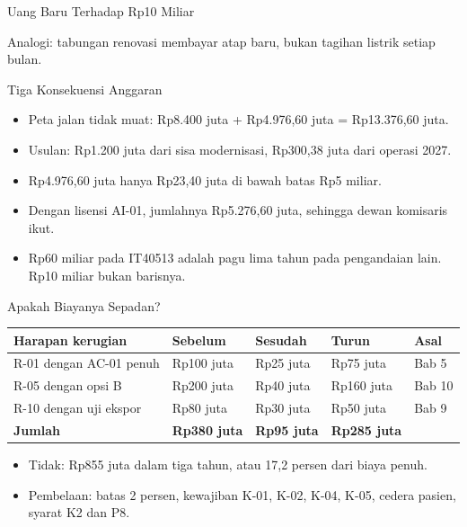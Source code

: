 \documentclass[aspectratio=169, table, 12pt]{beamer}
\begin{document}
\begin{frame}{{\Large Uang Baru Terhadap Rp10 Miliar}}
  \vspace{6pt}
  \begin{center}
    \resizebox{0.95\textwidth}{!}{}
  \end{center}
  \vspace{2pt}
  \small Analogi: tabungan renovasi membayar atap baru, bukan tagihan listrik setiap bulan.
\end{frame}

\begin{frame}{{\Large Tiga Konsekuensi Anggaran}}
  \vspace{6pt}
  \small
  \begin{itemize}
    \item Peta jalan tidak muat: Rp8.400 juta + Rp4.976,60 juta = Rp13.376,60 juta.
    \item Usulan: Rp1.200 juta dari sisa modernisasi, Rp300,38 juta dari operasi 2027.
    \item Rp4.976,60 juta hanya Rp23,40 juta di bawah batas Rp5 miliar.
    \item Dengan lisensi AI-01, jumlahnya Rp5.276,60 juta, sehingga dewan komisaris ikut.
    \item Rp60 miliar pada IT40513 adalah pagu lima tahun pada pengandaian lain. Rp10 miliar bukan barisnya.
  \end{itemize}
\end{frame}

\begin{frame}{{\Large Apakah Biayanya Sepadan?}}
  \vspace{2pt}
  \scriptsize
  \begin{tabularx}{\textwidth}{|>{\raggedright\arraybackslash}X|>{\raggedright\arraybackslash}p{}|>{\raggedright\arraybackslash}p{}|>{\raggedright\arraybackslash}p{}|>{\raggedright\arraybackslash}p{}|}
    \hline
    \textbf{Harapan kerugian} & \textbf{Sebelum} & \textbf{Sesudah} & \textbf{Turun} & \textbf{Asal}
    \\ \hline
    R-01 dengan AC-01 penuh & Rp100 juta & Rp25 juta & Rp75 juta & Bab 5 \\ \hline
    R-05 dengan opsi B & Rp200 juta & Rp40 juta & Rp160 juta & Bab 10 \\ \hline
    R-10 dengan uji ekspor & Rp80 juta & Rp30 juta & Rp50 juta & Bab 9 \\ \hline
    \textbf{Jumlah} & \textbf{Rp380 juta} & \textbf{Rp95 juta} & \textbf{Rp285 juta} & \\ \hline
  \end{tabularx}

  \vspace{6pt}
  \small
  \begin{itemize}
    \item Tidak: Rp855 juta dalam tiga tahun, atau 17,2 persen dari biaya penuh.
    \item Pembelaan: batas 2 persen, kewajiban K-01, K-02, K-04, K-05, cedera pasien, syarat K2 dan P8.
  \end{itemize}
\end{frame}
\end{document}
